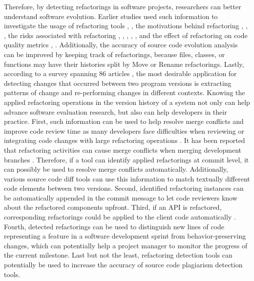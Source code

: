 \documentclass[letterpaper,12pt,onecolumn,final]{report}
\begin{document}
Therefore, by detecting refactorings in software projects, researchers can better understand software evolution. Earlier studies used such information to investigate the usage of refactoring tools  \cite{MurphyHill2012}, \cite{Negara2013}, the motivations behind refactoring \cite{kim2012field}, \cite{kim2014empirical}, \cite{Silva2016}, the risks associated with refactoring \cite{kim2012field}, \cite{kim2014empirical}, \cite{kim2011empirical}, \cite{weissgerber2006refactorings}, \cite{bavota2012does}, and the effect of refactoring on code quality metrics \cite{kim2012field}, \cite{kim2014empirical}. Additionally, the accuracy of source code evolution analysis can be improved by keeping track of refactorings, because files, classes, or functions may have their histories split by Move or Rename \cite{hora2018assessing} refactorings. Lastly, according to a survey spanning 86 articles \cite{soetens2017changes}, the most desirable application for detecting changes that occurred between two program versions is extracting patterns of change and re-performing changes in different contexts.
Knowing the applied refactoring operations in the version history of a system not only can help advance software evaluation research, but also can help developers in their practice. First, such information can be used to help resolve merge conflicts and improve code review time as many developers face difficulties when reviewing or integrating code changes with large refactoring operations \cite{kim2012field}. It has been reported that refactoring activities can cause merge conflicts when merging development branches \cite{mahmoudi2019refactorings}. Therefore, if a tool can identify applied refactorings at commit level, it can possibly be used to resolve merge conflicts automatically. Additionally, various source code diff tools can use this information to match textually different code elements between two versions. Second, identified refactoring instances can be automatically appended in the commit message to let code reviewers know about the refactored components upfront. Third, if an API is refactored, corresponding refactorings could be applied to the client code automatically \cite{henkel2005catchup} \cite{Xing2008}. Fourth, detected refactorings can be used to distinguish new lines of code representing a feature in a software development sprint from behavior-preserving changes, which can potentially help a project manager to monitor the progress of the current milestone. Last but not the least, refactoring detection tools can potentially be used to increase the accuracy of source code plagiarism detection tools.
\end{document}
